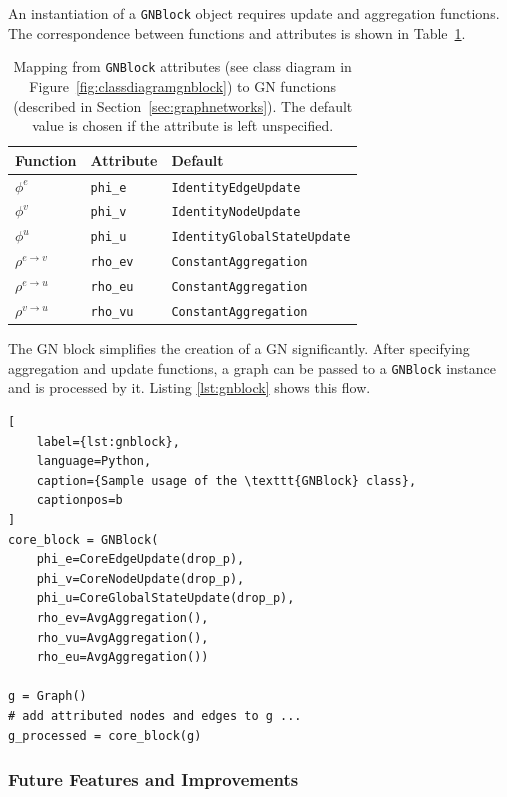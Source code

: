 An instantiation of a \texttt{GNBlock} object requires update and aggregation functions. The correspondence between functions and attributes is shown in Table~\ref{tab:gnblockattrs}.

\begin{table}
    \centering
    \begin{tabular}{ l l l }
        \hline
        \textbf{Function} & \textbf{Attribute} & \textbf{Default}\\
        \hline
        $\phi^e$ & \texttt{phi\_e} & \texttt{IdentityEdgeUpdate} \\
        $\phi^v$ & \texttt{phi\_v} & \texttt{IdentityNodeUpdate} \\
        $\phi^u$ & \texttt{phi\_u} & \texttt{IdentityGlobalStateUpdate} \\
        $\rho^{e\rightarrow v}$ & \texttt{rho\_ev} & \texttt{ConstantAggregation} \\
        $\rho^{e\rightarrow u}$ & \texttt{rho\_eu} & \texttt{ConstantAggregation} \\
        $\rho^{v\rightarrow u}$ & \texttt{rho\_vu} & \texttt{ConstantAggregation} \\
        \hline
    \end{tabular}
    \caption[Mapping from \texttt{GNBlock} attributes to GN functions]{Mapping from \texttt{GNBlock} attributes (see class diagram in Figure~\ref{fig:classdiagramgnblock}) to GN functions (described in Section~\ref{sec:graphnetworks}). The default value is chosen if the attribute is left unspecified.}
    \label{tab:gnblockattrs}
\end{table}

The GN block simplifies the creation of a GN significantly. After specifying aggregation and update functions, a graph can be passed to a \texttt{GNBlock} instance and is processed by it. Listing \ref{lst:gnblock} shows this flow.

\begin{lstlisting}[
    label={lst:gnblock},
    language=Python,
    caption={Sample usage of the \texttt{GNBlock} class},
    captionpos=b
]
core_block = GNBlock(
    phi_e=CoreEdgeUpdate(drop_p),
    phi_v=CoreNodeUpdate(drop_p),
    phi_u=CoreGlobalStateUpdate(drop_p),
    rho_ev=AvgAggregation(),
    rho_vu=AvgAggregation(),
    rho_eu=AvgAggregation())

g = Graph()
# add attributed nodes and edges to g ...
g_processed = core_block(g)
\end{lstlisting}

\subsubsection{Future Features and Improvements}
\label{sec:gnlibfuturefeatures}

